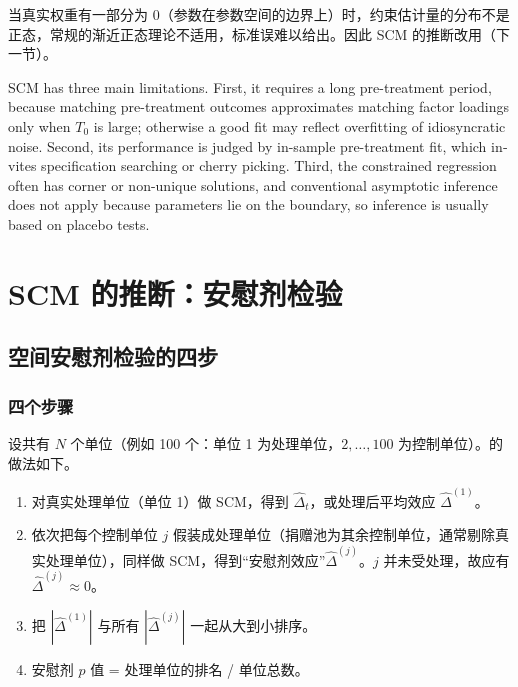 当真实权重有一部分为 0（参数在参数空间的边界上）时，约束估计量的分布不是正态，常规的渐近正态理论不适用，标准误难以给出。因此 SCM 的推断改用（下一节）。

\begin{english}
SCM has three main limitations. First, it requires a long pre-treatment period, because matching pre-treatment outcomes approximates matching factor loadings only when $T_0$ is large; otherwise a good fit may reflect overfitting of idiosyncratic noise. Second, its performance is judged by in-sample pre-treatment fit, which invites specification searching or cherry picking. Third, the constrained regression often has corner or non-unique solutions, and conventional asymptotic inference does not apply because parameters lie on the boundary, so inference is usually based on placebo tests.
\end{english}

\section{SCM 的推断：安慰剂检验}\label{sec:U16-placebo}

\subsection{空间安慰剂检验的四步}

\subsubsection{四个步骤}

设共有 $N$ 个单位（例如 100 个：单位 1 为处理单位，$2,\dots,100$ 为控制单位）。的做法如下。

\begin{method}[空间安慰剂检验]
\begin{enumerate}
  \item 对真实处理单位（单位 1）做 SCM，得到 $\hat\Delta_t$，或处理后平均效应 $\hat\Delta^{(1)}$。
  \item 依次把每个控制单位 $j$ 假装成处理单位（捐赠池为其余控制单位，通常剔除真实处理单位），同样做 SCM，得到“安慰剂效应”$\hat\Delta^{(j)}$。$j$ 并未受处理，故应有 $\hat\Delta^{(j)}\approx0$。
  \item 把 $|\hat\Delta^{(1)}|$ 与所有 $|\hat\Delta^{(j)}|$ 一起从大到小排序。
  \item 安慰剂 $p$ 值 = 处理单位的排名 / 单位总数。
\end{enumerate}
\end{method}


